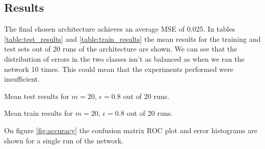 \documentclass[a4paper, 11pt]{article}
\begin{document}
\subsection{Results}
The final chosen architecture achieves an average MSE of 0.025. In tables \ref{table:test_results} and \ref{table:train_results} the mean results for the training and test sets out of 20 runs of the architecture are shown. We can see that the distribution of errors in the two classes isn't as balanced as when we ran the network 10 times. This could mean that the experiments performed were insufficient. 
\begin{table}[h!]
\caption{Mean test results for $m=20$, $\epsilon=0.8$ out of 20 runs.}
\label{table:test_results}
\end{table}

\begin{table}[h!]
\caption{Mean train results for $m=20$, $\epsilon=0.8$ out of 20 runs.}
\label{table:train_results}
\end{table}


On figure \ref{fig:accuracy} the confusion matrix ROC plot and error histograms are shown for a single run of the network.
\end{document}
